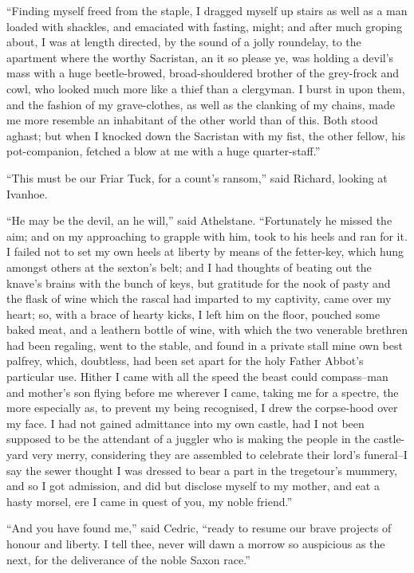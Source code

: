 ``Finding myself freed from the staple, I dragged myself up stairs as
well as a man loaded with shackles, and emaciated with fasting, might;
and after much groping about, I was at length directed, by the sound of
a jolly roundelay, to the apartment where the worthy Sacristan, an it so
please ye, was holding a devil's mass with a huge beetle-browed,
broad-shouldered brother of the grey-frock and cowl, who looked much
more like a thief than a clergyman. I burst in upon them, and the
fashion of my grave-clothes, as well as the clanking of my chains, made
me more resemble an inhabitant of the other world than of this. Both
stood aghast; but when I knocked down the Sacristan with my fist, the
other fellow, his pot-companion, fetched a blow at me with a huge
quarter-staff.''

``This must be our Friar Tuck, for a count's ransom,'' said Richard,
looking at Ivanhoe.

``He may be the devil, an he will,'' said Athelstane. ``Fortunately he
missed the aim; and on my approaching to grapple with him, took to his
heels and ran for it. I failed not to set my own heels at liberty by
means of the fetter-key, which hung amongst others at the sexton's belt;
and I had thoughts of beating out the knave's brains with the bunch of
keys, but gratitude for the nook of pasty and the flask of wine which
the rascal had imparted to my captivity, came over my heart; so, with a
brace of hearty kicks, I left him on the floor, pouched some baked meat,
and a leathern bottle of wine, with which the two venerable brethren had
been regaling, went to the stable, and found in a private stall mine own
best palfrey, which, doubtless, had been set apart for the holy Father
Abbot's particular use. Hither I came with all the speed the beast could
compass--man and mother's son flying before me wherever I came, taking
me for a spectre, the more especially as, to prevent my being
recognised, I drew the corpse-hood over my face. I had not gained
admittance into my own castle, had I not been supposed to be the
attendant of a juggler who is making the people in the castle-yard very
merry, considering they are assembled to celebrate their lord's
funeral--I say the sewer thought I was dressed to bear a part in the
tregetour's mummery, and so I got admission, and did but disclose myself
to my mother, and eat a hasty morsel, ere I came in quest of you, my
noble friend.''

``And you have found me,'' said Cedric, ``ready to resume our brave
projects of honour and liberty. I tell thee, never will dawn a morrow so
auspicious as the next, for the deliverance of the noble Saxon race.''

